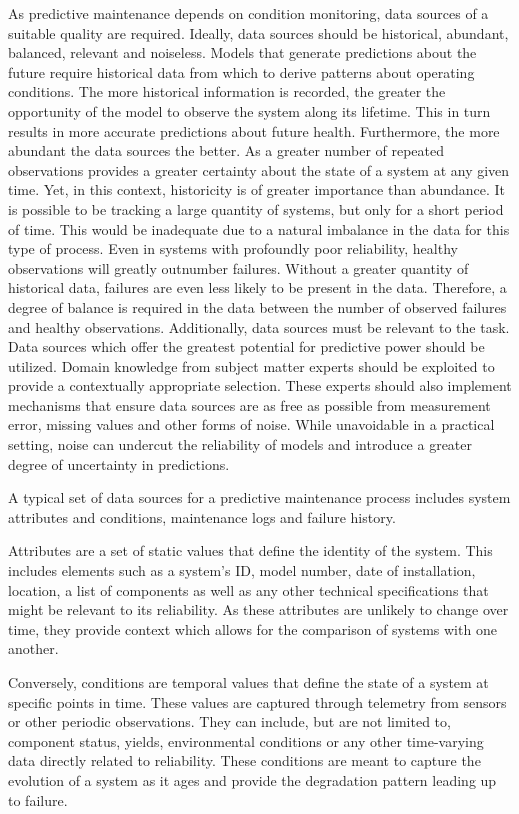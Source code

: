 As predictive maintenance depends on condition monitoring, data sources of a suitable quality are required. Ideally, data sources should be historical, abundant, balanced, relevant and noiseless. Models that generate predictions about the future require historical data from which to derive patterns about operating conditions. The more historical information is recorded, the greater the opportunity of the model to observe the system along its lifetime. This in turn results in more accurate predictions about future health. Furthermore, the more abundant the data sources the better. As a greater number of repeated observations provides a greater certainty about the state of a system at any given time. Yet, in this context, historicity is of greater importance than abundance. It is possible to be tracking a large quantity of systems, but only for a short period of time. This would be inadequate due to a natural imbalance in the data for this type of process. Even in systems with profoundly poor reliability, healthy observations will greatly outnumber failures. Without a greater quantity of historical data, failures are even less likely to be present in the data. Therefore, a degree of balance is required in the data between the number of observed failures and healthy observations. Additionally, data sources must be relevant to the task. Data sources which offer the greatest potential for predictive power should be utilized. Domain knowledge from subject matter experts should be exploited to provide a contextually appropriate selection. These experts should also implement mechanisms that ensure data sources are as free as possible from measurement error, missing values and other forms of noise. While unavoidable in a practical setting, noise can undercut the reliability of models and introduce a greater degree of uncertainty in predictions. 

A typical set of data sources for a predictive maintenance process includes system attributes and conditions, maintenance logs and failure history\cite{Uz2016}. 

Attributes are a set of static values that define the identity of the system. This includes elements such as a system's ID, model number, date of installation, location, a list of components as well as any other technical specifications that might be relevant to its reliability. As these attributes are unlikely to change over time, they provide context which allows for the comparison of systems with one another. 

Conversely, conditions are temporal values that define the state of a system at specific points in time. These values are captured through telemetry from sensors or other periodic observations. They can include, but are not limited to, component status, yields, environmental conditions or any other time-varying data directly related to reliability. These conditions are meant to capture the evolution of a system as it ages and provide the degradation pattern leading up to failure. 

